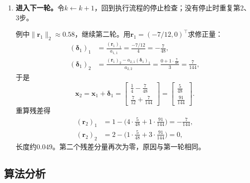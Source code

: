 \begin{enumerate}
 \item \textbf{进入下一轮。}令$k\leftarrow k+1$，回到执行流程的停止检查；没有停止时重复第2、3步。

 例中$\lVert\bm r_1\rVert_2\approx0.58$，继续第二轮。用$\bm r_1=(-7/12,0)^\top$求修正量：
 \[
  \begin{aligned}
  (\bm\delta_1)_1&=\frac{(\bm r_1)_1}{a_{1,1}}=\frac{-7/12}{4}=-\frac7{48},\\
  (\bm\delta_1)_2&=\frac{(\bm r_1)_2-a_{2,1}(\bm\delta_1)_1}{a_{2,2}}=\frac{0+1\cdot\tfrac7{48}}{3}=\frac7{144},
  \end{aligned}
 \]
 于是
 \[
  \bm x_2=\bm x_1+\bm\delta_1=\begin{bmatrix}\tfrac14-\tfrac7{48}\\\tfrac7{12}+\tfrac7{144}\end{bmatrix}=\begin{bmatrix}\tfrac5{48}\\\tfrac{91}{144}\end{bmatrix}.
 \]
 重算残差得
 \[
  \begin{aligned}
  (\bm r_2)_1&=1-\bigl(4\cdot\tfrac5{48}+1\cdot\tfrac{91}{144}\bigr)=-\tfrac7{144},\\
  (\bm r_2)_2&=2-\bigl(1\cdot\tfrac5{48}+3\cdot\tfrac{91}{144}\bigr)=0 ,
  \end{aligned}
 \]
 长度约$0.049$。第二个残差分量再次为零，原因与第一轮相同。
\end{enumerate}

\subsection{算法分析}

